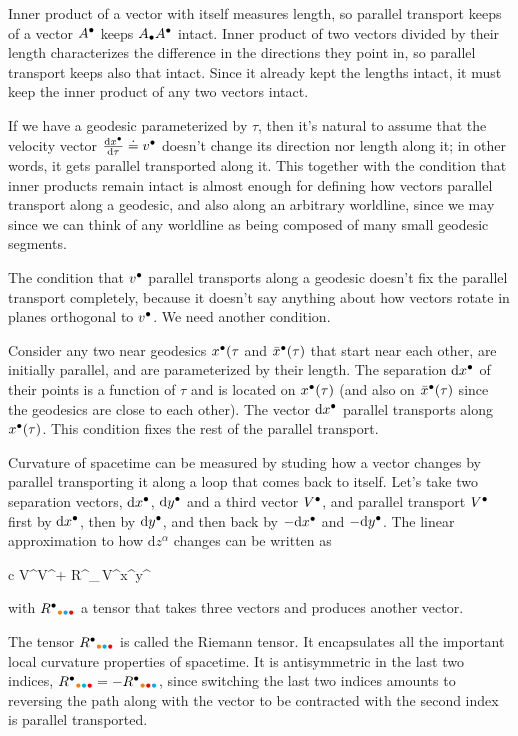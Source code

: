 \documentclass[11pt,oneside%
]{memoir}
\newenvironment{eqna}{\begin{IEEEeqnarray*}{c}}{\end{IEEEeqnarray*}\ignorespacesafterend}
\newcommand{\der}[2]{\frac{\dd#1}{\dd#2}}
\newcommand{\dd}{\mathrm{d}}
\newcommand{\coa}{{\color{black}\bullet}}
\newcommand{\cob}{{\color{oranssi}\bullet}}
\newcommand{\coc}{{\color{cyan}\bullet}}
\newcommand{\cod}{{\color{red}\bullet}}
\begin{document}
Inner product of a vector with itself measures length, so parallel transport keeps of a vector \(A^\coa\) keeps \(A_\coa A^\coa\) intact. Inner product of two vectors divided by their length characterizes the difference in the directions they point in, so parallel transport keeps also that intact. Since it already kept the lengths intact, it must keep the inner product of any two vectors intact.

If we have a geodesic parameterized by \(\tau\), then it's natural to assume that the velocity vector \(\der{x^\coa}{\tau}\doteq v^\coa\) doesn't change its direction nor length along it; in other words, it gets parallel transported along it. This together with the condition that inner products remain intact is almost enough for defining how vectors parallel transport along a geodesic, and also along an arbitrary worldline, since we may since we can think of any worldline as being composed of many small geodesic segments.

The condition that \(v^\coa\) parallel transports along a geodesic doesn't fix the parallel transport completely, because it doesn't say anything about how vectors rotate in planes orthogonal to \(v^\coa\). We need another condition.

Consider any two near geodesics \(x^\coa(\tau\) and \(\bar{x}^\coa(\tau)\) that start near each other, are initially parallel, and are parameterized by their length. The separation \(\dd x^\coa\) of their points is a function of \(\tau\) and is located on \(x^\coa(\tau)\) (and also on \(\bar{x}^\coa(\tau)\) since the geodesics are close to each other). The vector \(\dd x^\coa\) parallel transports along \(x^\coa(\tau)\). This condition fixes the rest of the parallel transport.

Curvature of spacetime can be measured by studing how a vector changes by parallel transporting it along a loop that comes back to itself. Let's take two separation vectors, \(\dd x^\coa\), \(\dd y^\coa\) and a third vector \(V^\coa\), and parallel transport \(V^\coa\) first by \(\dd x^\coa\), then by \(\dd y^\coa\), and then back by \(-\dd x^\coa\) and \(-\dd y^\coa\). The linear approximation to how \(\dd z^\alpha\) changes can be written as
\begin{eqna}
V^\coa\rightarrow V^\coa + R^\coa_{\cob\coc\cod}\,V^\cob\dd x^\coc\dd y^\cod
\end{eqna}
with \(R^\coa_{\cob\coc\cod}\) a tensor that takes three vectors and produces another vector.

The tensor \(R^\coa_{\cob\coc\cod}\) is called the Riemann tensor. It encapsulates all the important local curvature properties of spacetime. It is antisymmetric in the last two indices, \(R^\coa_{\cob\coc\cod}=-R^\coa_{\cob\cod\coc}\), since switching the last two indices amounts to reversing the path along with the vector to be contracted with the second index is parallel transported.
\end{document}
